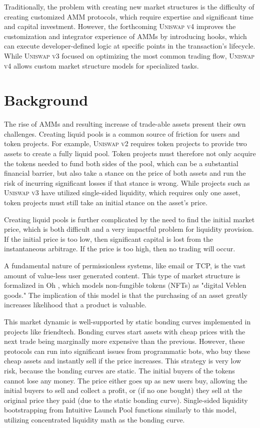 \documentclass[sigconf,nonacm,prologue,table]{acmart}
\numberwithin{equation}{section}
\theoremstyle{definition}
\theoremstyle{remark}
\begin{document}
Traditionally, the problem with creating new market structures is the difficulty of creating customized AMM protocols, which require expertise and significant time and capital investment. However, the forthcoming \textsc{Uniswap v4} \cite{Adams23} improves the customization and integrator experience of AMMs by introducing hooks, which can execute developer-defined logic at specific points in the transaction's lifecycle. While \textsc{Uniswap v3} \cite{Adams21} focused on optimizing the most common trading flow, \textsc{Uniswap v4} allows custom market structure models for specialized tasks.

\section{Background} 
\label{sec:Background}

The rise of AMMs and resulting increase of trade-able assets present their own challenges. Creating liquid pools is a common source of friction for users and token projects. For example, \textsc{Uniswap v2} \cite{Adams20} requires token projects to provide two assets to create a fully liquid pool. Token projects must therefore not only acquire the tokens needed to fund both sides of the pool, which can be a substantial financial barrier, but also take a stance on the price of both assets and run the risk of incurring significant losses if that stance is wrong. While projects such as \textsc{Uniswap v3} \cite{Adams21} have utilized single-sided liquidity, which requires only one asset, token projects must still take an initial stance on the asset’s price. 

Creating liquid pools is further complicated by the need to find the initial market price, which is both difficult and a very impactful problem for liquidity provision. If the initial price is too low, then significant capital is lost from the instantaneous arbitrage. If the price is too high, then no trading will occur. 

A fundamental nature of permissionless systems, like email or TCP, is the vast amount of value-less user generated content. This type of market structure is formalized in Oh \cite{oh2023digital}, which models non-fungible tokens (NFTs) as "digital Veblen goods." The implication of this model is that the purchasing of an asset greatly increases likelihood that a product is valuable.

This market dynamic is well-supported by static bonding curves implemented in projects like friendtech. Bonding curves start assets with cheap prices with the next trade being marginally more expensive than the previous. However, these protocols can run into significant issues from programmatic bots, who buy these cheap assets and instantly sell if the price increases. This strategy is very low risk, because the bonding curves are static. The initial buyers of the tokens cannot lose any money. The price either goes up as new users buy, allowing the initial buyers to sell and collect a profit, or (if no one bought) they sell at the original price they paid (due to the static bonding curve). Single-sided liquidity bootstrapping from Intuitive Launch Pool functions similarly to this model, utilizing concentrated liquidity math as the bonding curve.
\end{document}
